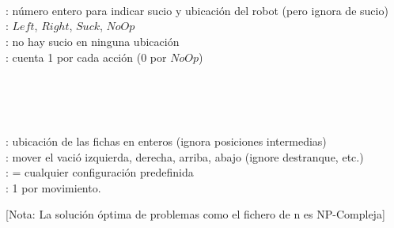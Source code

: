 \documentclass{article}
\begin{document}
\begin{huge}

\textwidth
{}

\\
\\
\\



\textwidth
{}

: n{\'u}mero entero para indicar sucio y ubicaci{\'o}n del robot (pero ignora   de sucio)\\
: $Left$, $Right$, $Suck$, $NoOp$\\
: no hay sucio en ninguna ubicaci{\'o}n\\
: cuenta 1 por cada acci{\'o}n (0 por $NoOp$)




\textwidth
{}

\\
\\
\\





\textwidth
{}

: ubicaci{\'o}n de las fichas en enteros (ignora posiciones intermedias)\\
: mover el vaci{\'o} izquierda, derecha, arriba, abajo (ignore destranque, etc.)\\
: = cualquier configuraci{\'o}n predefinida\\
: 1 por movimiento.

[Nota: La soluci{\'o}n {\'o}ptima de problemas como el fichero de
n es NP-Compleja]





\end{huge}
\end{document}
